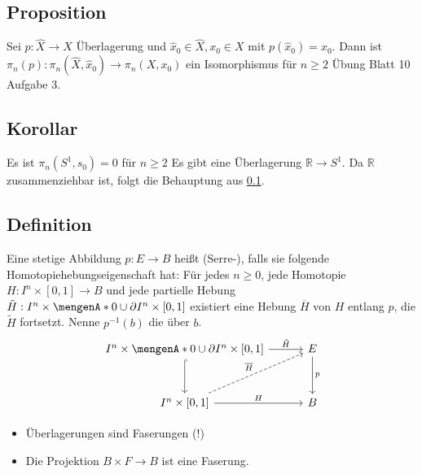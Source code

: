 \subsection[Proposition: Für $n \ge 2$ und eine Überlagerung $p$ ist $\pi_n(p)$ ein Isomorphismus]{Proposition} %
\label{sub:148}
Sei $p : \hat{X} \to X$ Überlagerung und $\hat{x}_0 \in \hat{X}, x_0 \in X$ mit $p(\hat{x}_0) = x_0$. Dann ist $\pi_n(p) : \pi_n(\hat{X}, \hat{x}_0) \to \pi_n(X,x_0)$ ein
Isomorphismus für $n \ge 2$
Übung Blatt 10 Aufgabe 3. 

\subsection[Korollar: $\pi_n(S^1, s_0) = 0$ für $n \ge 2$]{Korollar} %
\label{sub:149}
Es ist $\pi_n(S^1, s_0) = 0$ für $n \ge 2$
Es gibt eine Überlagerung $\mathds{R} \to S^1$. Da $\mathds{R}$ zusammenziehbar ist, folgt die Behauptung aus \ref{sub:148}. \bewende

\subsection[Definition: Serre-Faserung]{Definition} %
\label{sub:1410}
Eine stetige Abbildung $p : E \to B$ heißt (Serre-), falls sie folgende Homotopiehebungseigenschaft hat: Für jedes $n \ge 0$, jede Homotopie 
$H : I^n \times [0,1] \to B$ und jede partielle Hebung $\tilde{H} : I^n \times \set{0} \cup \partial I^n \times [0,1]$ existiert eine Hebung $\overline{H}$ von $H$
entlang $p$, die $\tilde{H}$ fortsetzt. Nenne $p ^{-1}(b)$ die  über $b$. 
\[
	\begin{tikzcd}[row sep=3em, column sep=3em]
		I^n \times \set{0} \cup \partial I^n \times [0,1] \rar["\tilde{H}"]  \dar[hook]& E \dar["p"] \\
		I^n \times [0,1] \rar["H"] \urar[dashed, "\overline{H} "]& B
	\end{tikzcd}
\]
\begin{itemize}
	\item Überlagerungen sind Faserungen (!)
	\item Die Projektion $B \times F \to B$ ist eine Faserung.
\end{itemize}

